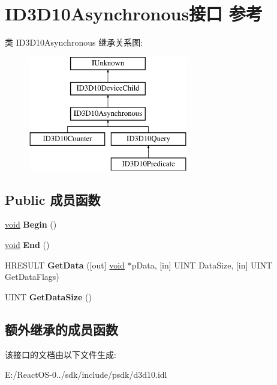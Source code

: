 \hypertarget{interface_i_d3_d10_asynchronous}{}\section{I\+D3\+D10\+Asynchronous接口 参考}
\label{interface_i_d3_d10_asynchronous}
类 I\+D3\+D10\+Asynchronous 继承关系图\+:\begin{figure}[H]
\begin{center}
\leavevmode
\includegraphics[height=5.000000cm]{interface_i_d3_d10_asynchronous}
\end{center}
\end{figure}
\subsection*{Public 成员函数}
\begin{DoxyCompactItemize}
\item 
\mbox{\label{interface_i_d3_d10_asynchronous_aab9ab111b1df01f81d24eceb0f0641a0}} 
\hyperlink{interfacevoid}{void} {\bfseries Begin} ()
\item 
\mbox{\label{interface_i_d3_d10_asynchronous_ac2207c0b8084620bac9691c051fa13f3}} 
\hyperlink{interfacevoid}{void} {\bfseries End} ()
\item 
\mbox{\label{interface_i_d3_d10_asynchronous_ab8e0014d85fce47f24514b0e0f1e4d5a}} 
H\+R\+E\+S\+U\+LT {\bfseries Get\+Data} (\mbox{[}out\mbox{]} \hyperlink{interfacevoid}{void} $\ast$p\+Data, \mbox{[}in\mbox{]} U\+I\+NT Data\+Size, \mbox{[}in\mbox{]} U\+I\+NT Get\+Data\+Flags)
\item 
\mbox{\label{interface_i_d3_d10_asynchronous_acd7152f5c9b2e09934bb0b07a46c9814}} 
U\+I\+NT {\bfseries Get\+Data\+Size} ()
\end{DoxyCompactItemize}
\subsection*{额外继承的成员函数}


该接口的文档由以下文件生成\+:\begin{DoxyCompactItemize}
\item 
E\+:/\+React\+O\+S-\/0../sdk/include/psdk/d3d10.\+idl\end{DoxyCompactItemize}
